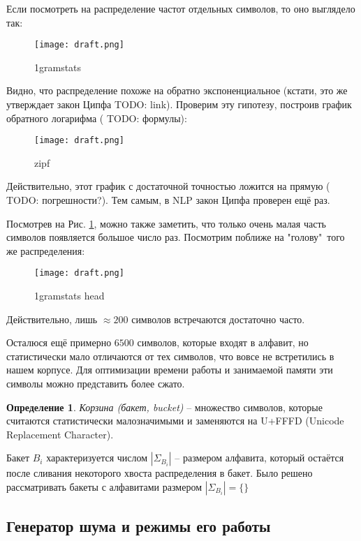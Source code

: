 \documentclass[14pt,russian]{extreport}
\theoremstyle{definition}
\newtheorem{definition}{Определение}[subsection]
\newcommand{\todo}[1]{}
\renewcommand{\todo}[1]{{\color{red} TODO: {#1}}}
\begin{document}
Если посмотреть на распределение частот отдельных символов, то оно выглядело так:

\begin{figure}[H]
	\centering
	\texttt{[image: draft.png]}
	\caption{1gramstats}
	\label{fig:1gramstats_all}
\end{figure}

Видно, что распределение похоже на обратно экспоненциальное (кстати, это же утверждает закон Ципфа \todo{link}). Проверим эту гипотезу, построив график обратного логарифма (\todo{формулы}):

\begin{figure}[H]
	\centering
	\texttt{[image: draft.png]}
	\caption{zipf}
	\label{fig:zipf1gram}
\end{figure}

Действительно, этот график с достаточной точностью ложится на прямую (\todo{погрешности?}). Тем самым, в NLP закон Ципфа проверен ещё раз.

Посмотрев на Рис. \ref{fig:1gramstats_all}, можно также заметить, что только очень малая часть символов появляется большое число раз. Посмотрим поближе на "голову"\ того же распределения:

\begin{figure}[H]
	\centering
	\texttt{[image: draft.png]}
	\caption{1gramstats head}
	\label{fig:1gramstats_head}
\end{figure}

Действительно, лишь $\approx 200$ символов встречаются достаточно часто.

Осталюся ещё примерно $6500$ символов, которые входят в алфавит, но статистически мало отличаются от тех символов, что вовсе не встретились в нашем корпусе. Для оптимизации времени работы и занимаемой памяти эти символы можно представить более сжато.

\begin{definition}
	{\textit{Корзина (бакет, bucket)}} -- множество символов, которые считаются статистически малозначимыми и заменяются на U+FFFD (Unicode Replacement Character).
\end{definition}

Бакет $B_i$ характеризуется числом $|\Sigma_{B_i}|$ -- размером алфавита, который остаётся после сливания некоторого хвоста распределения в бакет. Было решено рассматривать бакеты с алфавитами размером $|\Sigma_{B_i}| = \{  \}$

\subsection{ Генератор шума и режимы его работы }
\end{document}
